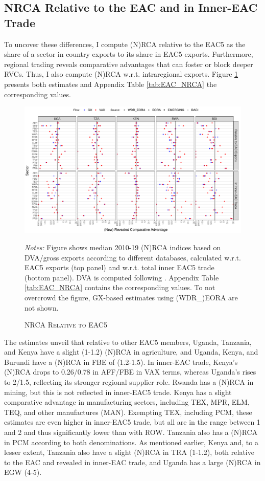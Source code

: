 \documentclass[a4paper]{article}
\begin{document}
\subsection{NRCA Relative to the EAC and in Inner-EAC Trade}

To uncover these differences, I compute (N)RCA relative to the EAC5 as the share of a sector in country exports to its share in EAC5 exports. Furthermore, regional trading reveals comparative advantages that can foster or block deeper RVCs. Thus, I also compute (N)RCA w.r.t. intraregional exports. Figure \ref{fig:EAC_NRCA} presents both estimates and Appendix Table \ref{tab:EAC_NRCA} the corresponding values. 

\begin{figure}[h!]
\centering
\caption{\label{fig:EAC_NRCA}\textsc{NRCA Relative to EAC5}}
\includegraphics[width=1\textwidth]{"Figures/EAC_NRCA_EAC5_ALL.pdf"} \\
\raggedright
\scriptsize
\emph{Notes:} Figure shows median 2010-19 (N)RCA indices based on DVA/gross exports according to different databases, calculated w.r.t. EAC5 exports (top panel) and w.r.t. total inner EAC5 trade (bottom panel). DVA is computed following \citet{borin2019measuring}. Appendix Table \ref{tab:EAC_NRCA} contains the corresponding values. To not overcrowd the figure, GX-based estimates using (WDR\_)EORA are not shown.
\end{figure}
\FloatBarrier

The estimates unveil that relative to other EAC5 members, Uganda, Tanzania, and Kenya have a slight (1-1.2) (N)RCA in agriculture, and Uganda, Kenya, and Burundi have a (N)RCA in FBE of (1.2-1.5). In inner-EAC trade, Kenya's (N)RCA drops to 0.26/0.78 in AFF/FBE in VAX terms, whereas Uganda's rises to 2/1.5, reflecting its stronger regional supplier role. Rwanda has a (N)RCA in mining, but this is not reflected in inner-EAC5 trade. Kenya has a slight comparative advantage in manufacturing sectors, including TEX, MPR, ELM, TEQ, and other manufactures (MAN). Exempting TEX, including PCM, these estimates are even higher in inner-EAC5 trade, but all are in the range between 1 and 2 and thus significantly lower than with ROW. Tanzania also has a (N)RCA in PCM according to both denominations. As mentioned earlier, Kenya and, to a lesser extent, Tanzania also have a slight (N)RCA in TRA (1-1.2), both relative to the EAC and revealed in inner-EAC trade, and Uganda has a large (N)RCA in EGW (4-5). \newline
\end{document}
